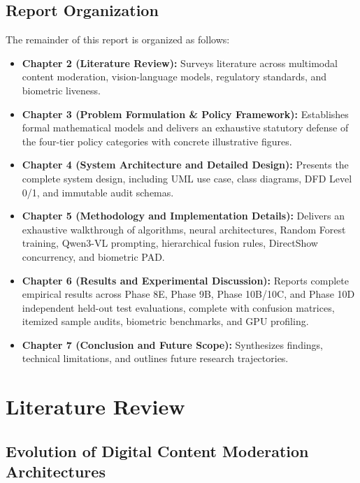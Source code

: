\documentclass[12pt,a4paper]{report}
\begin{document}
\section{Report Organization}

The remainder of this report is organized as follows:
\begin{itemize}
    \item \textbf{Chapter 2 (Literature Review):} Surveys literature across multimodal content moderation, vision-language models, regulatory standards, and biometric liveness.
    \item \textbf{Chapter 3 (Problem Formulation \& Policy Framework):} Establishes formal mathematical models and delivers an exhaustive statutory defense of the four-tier policy categories with concrete illustrative figures.
    \item \textbf{Chapter 4 (System Architecture and Detailed Design):} Presents the complete system design, including UML use case, class diagrams, DFD Level 0/1, and immutable audit schemas.
    \item \textbf{Chapter 5 (Methodology and Implementation Details):} Delivers an exhaustive walkthrough of algorithms, neural architectures, Random Forest training, Qwen3-VL prompting, hierarchical fusion rules, DirectShow concurrency, and biometric PAD.
    \item \textbf{Chapter 6 (Results and Experimental Discussion):} Reports complete empirical results across Phase 8E, Phase 9B, Phase 10B/10C, and Phase 10D independent held-out test evaluations, complete with confusion matrices, itemized sample audits, biometric benchmarks, and GPU profiling.
    \item \textbf{Chapter 7 (Conclusion and Future Scope):} Synthesizes findings, technical limitations, and outlines future research trajectories.
\end{itemize}




\chapter{Literature Review}

\section{Evolution of Digital Content Moderation Architectures}
\end{document}
